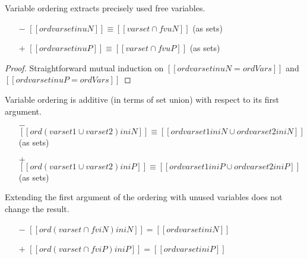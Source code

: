 \begin{lemma}
  \label{lemma:ord-soundness}
  Variable ordering extracts precisely used free variables.
  \begin{itemize}
    \item[$-$] $[[ {ord varset in uN} ]] \equiv [[varset ∩ fv uN]]$ (as sets)
    \item[$+$] $[[ {ord varset in uP} ]] \equiv [[varset ∩ fv uP]]$ (as sets)
  \end{itemize}
\end{lemma}
\begin{proof}
  Straightforward mutual induction on 
  $[[ ord varset in uN = ordVars ]]$ and $[[ ord varset in uP = ordVars ]]$
\end{proof}


\begin{corollary}
  \label{corollary:ord-additivity}
  Variable ordering is additive (in terms of set union) with respect to its first argument.
  \begin{itemize}
    \item[$-$] $[[ {ord (varset1 ∪ varset2) in iN} ]]
                \equiv
                [[{ord varset1 in iN} ∪ {ord varset2 in iN}]]$ (as sets)
    \item[$+$] $[[{ord (varset1 ∪ varset2) in iP}]]
                \equiv
                [[{ord varset1 in iP} ∪ {ord varset2 in iP}]]$ (as sets)

  \end{itemize}
\end{corollary}

\begin{corollary}
  \label{corollary:ord-weakening}
  Extending the first argument of the ordering with unused variables does not
  change the result.
  \begin{itemize}
  \item[$-$] $[[ ord (varset ∩ fv iN) in iN ]] = [[ ord varset in iN ]]$
  \item[$+$] $[[ ord (varset ∩ fv iP) in iP ]] = [[ ord varset in iP ]]$
  \end{itemize}
\end{corollary}




